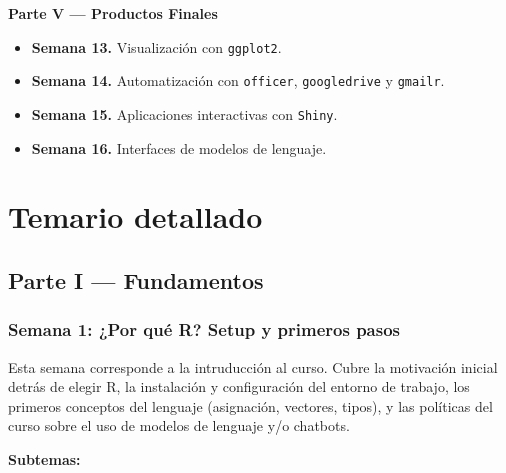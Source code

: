 \documentclass[11pt,letterpaper]{article}
\newcommand{\semana}[2]{%
  \subsubsection*{\color{main}Semana #1: #2}%
}
\begin{document}
\smallskip
\noindent\textbf{\textcolor{main}{Parte V --- Productos Finales}}
\begin{itemize}[leftmargin=*, itemsep=1pt]
    \item \textbf{Semana 13.} Visualización con \texttt{ggplot2}.
    \item \textbf{Semana 14.} Automatización con \texttt{officer}, \texttt{googledrive} y \texttt{gmailr}.
    \item \textbf{Semana 15.} Aplicaciones interactivas con \texttt{Shiny}.
    \item \textbf{Semana 16.} Interfaces de modelos de lenguaje.
\end{itemize}

\section{Temario detallado}

\subsection*{\color{main}Parte I --- Fundamentos}

\semana{1}{¿Por qué R? Setup y primeros pasos}

Esta semana corresponde a la intruducción al curso. Cubre la motivación inicial detrás de elegir R, la instalación y configuración del entorno de trabajo, los primeros conceptos del lenguaje (asignación, vectores, tipos), y las políticas del curso sobre el uso de modelos de lenguaje y/o chatbots.

\textbf{Subtemas:}
\end{document}
